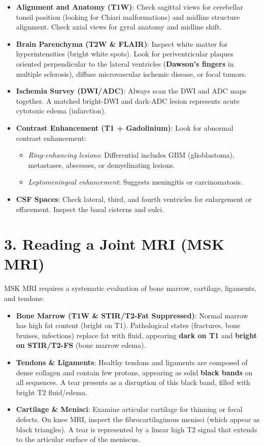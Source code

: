 \begin{itemize}
    \item \textbf{Alignment and Anatomy (T1W)}: Check sagittal views for cerebellar tonsil position (looking for Chiari malformations) and midline structure alignment. Check axial views for gyral anatomy and midline shift.
    \item \textbf{Brain Parenchyma (T2W \& FLAIR)}: Inspect white matter for hyperintensities (bright white spots). Look for periventricular plaques oriented perpendicular to the lateral ventricles (\textbf{Dawson's fingers} in multiple sclerosis), diffuse microvascular ischemic disease, or focal tumors.
    \item \textbf{Ischemia Survey (DWI/ADC)}: Always scan the DWI and ADC maps together. A matched bright-DWI and dark-ADC lesion represents acute cytotoxic edema (infarction).
    \item \textbf{Contrast Enhancement (T1 + Gadolinium)}: Look for abnormal contrast enhancement:
    \begin{itemize}
        \item \textit{Ring-enhancing lesions}: Differential includes GBM (glioblastoma), metastases, abscesses, or demyelinating lesions.
        \item \textit{Leptomeningeal enhancement}: Suggests meningitis or carcinomatosis.
    \end{itemize}
    \item \textbf{CSF Spaces}: Check lateral, third, and fourth ventricles for enlargement or effacement. Inspect the basal cisterns and sulci.
\end{itemize}


\section*{3. Reading a Joint MRI (MSK MRI)}
MSK MRI requires a systematic evaluation of bone marrow, cartilage, ligaments, and tendons:

\begin{itemize}
    \item \textbf{Bone Marrow (T1W \& STIR/T2-Fat Suppressed)}: Normal marrow has high fat content (bright on T1). Pathological states (fractures, bone bruises, infections) replace fat with fluid, appearing \textbf{dark on T1} and \textbf{bright on STIR/T2-FS} (bone marrow edema).
    \item \textbf{Tendons \& Ligaments}: Healthy tendons and ligaments are composed of dense collagen and contain few protons, appearing as solid \textbf{black bands} on all sequences. A tear presents as a disruption of this black band, filled with bright T2 fluid/edema.
    \item \textbf{Cartilage \& Menisci}: Examine articular cartilage for thinning or focal defects. On knee MRI, inspect the fibrocartilaginous menisci (which appear as black triangles). A tear is represented by a linear high T2 signal that extends to the articular surface of the meniscus.
\end{itemize}


